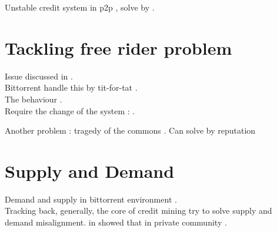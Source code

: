 
Unstable credit system in p2p \cite{2015:sustainabilitypt:vinko}, solve by \cite{2010:crashsustain:rahman}.

\section{Tackling free rider problem}
Issue discussed in \cite{2000:freeridegnutella:adar}.\\
Bittorrent handle this by tit-for-tat \cite{2003:bittorrent:cohen}.\\
The behaviour \cite{2015:freeriderinbtcommunity:das}.\\

Require the change of the system :  \cite{2008:givetogetvod:Mol}. 

Another problem : tragedy of the commons \cite{1968:tragedycommon:hardin}. Can solve by reputation \cite{2002:reputationtotragedy:milinski}

\section{Supply and Demand}
Demand and supply in bittorrent environment \cite{2009:demandsupplyres:andrade}. \\
Tracking back, generally, the core of credit mining try to solve supply and demand misalignment. \citeauthor{2011:interswarm:capota} in \citeyear{2011:interswarm:capota} showed that in private community \cite{2011:interswarm:capota}.\\


